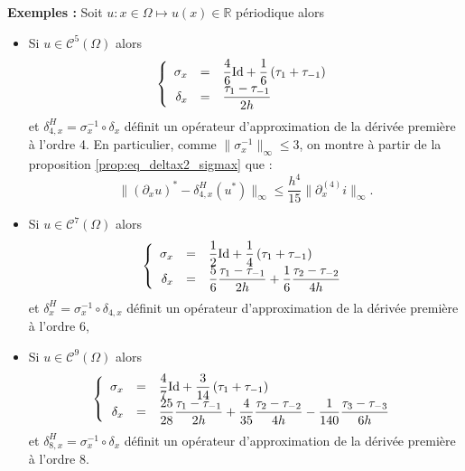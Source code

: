 \textbf{Exemples : }
Soit $u : x \in \Omega \mapsto u(x) \in \mathbb{R}$ périodique alors 
\begin{itemize}
\item Si $u \in \mathcal{C}^{5}(\Omega)$ alors 
\begin{equation}
\left\lbrace
\begin{array}{rcl}
\sigma_{x} &=& \dfrac{4}{6} \text{Id} + \dfrac{1}{6} \left( \tau_1 + \tau_{-1} \right)\\
\delta_{x} &=& \dfrac{\tau_1 - \tau_{-1}}{2h} \\ 
\end{array}
\right.
\label{eq:comp4}
\end{equation}
et $\delta^H_{4,x} = \sigma_x^{-1} \circ \delta_{x}$ définit un opérateur d'approximation de la dérivée première à l'ordre 4. En particulier, comme $\| \sigma_x^{-1} \|_{\infty} \leq 3$, on montre à partir de la proposition \ref{prop:eq_deltax2_sigmax} que :
\begin{equation}
\| (\partial_x u )^* - \delta_{4,x}^H (u^*) \|_{\infty} \leq \dfrac{h^4}{15} \| \partial_x^{(4)} i \|_{\infty}.
\label{eq:constante_err_derherm4}
\end{equation}

\item Si $u \in \mathcal{C}^{7}(\Omega)$ alors 
\begin{equation}
\left\lbrace
\begin{array}{rcl}
\sigma_{x} &=& \dfrac{1}{2} \text{Id} + \dfrac{1}{4}\left( \tau_1 + \tau_{-1} \right) \\
\delta_{x} &=& \dfrac{5}{6} \dfrac{\tau_1 - \tau_{-1}}{2h} + \dfrac{1}{6} \dfrac{\tau_2 - \tau_{-2}}{4h}\\ 
\end{array}
\right.
\label{eq:comp6}
\end{equation}
et $\delta^H_{x} = \sigma_{x}^{-1} \circ \delta_{4,x}$ définit un opérateur d'approximation de la dérivée première à l'ordre 6,


\item Si $u \in \mathcal{C}^{9}(\Omega)$ alors 
\begin{equation}
\left\lbrace
\begin{array}{rcl}
\sigma_{x} &=& \dfrac{4}{7} \text{Id} + \dfrac{3}{14}\left( \tau_1 + \tau_{-1} \right) \\
\delta_{x} &=& \dfrac{25}{28} \dfrac{\tau_1 - \tau_{-1}}{2h} + \dfrac{4}{35} \dfrac{\tau_2 - \tau_{-2}}{4h} - \dfrac{1}{140} \dfrac{\tau_3 - \tau_{-3}}{6h} \\ 
\end{array}
\right.
\label{eq:comp8}
\end{equation}
et $\delta^H_{8,x} = \sigma_{x}^{-1} \circ \delta_{x}$ définit un opérateur d'approximation de la dérivée première à l'ordre 8.
\end{itemize}


